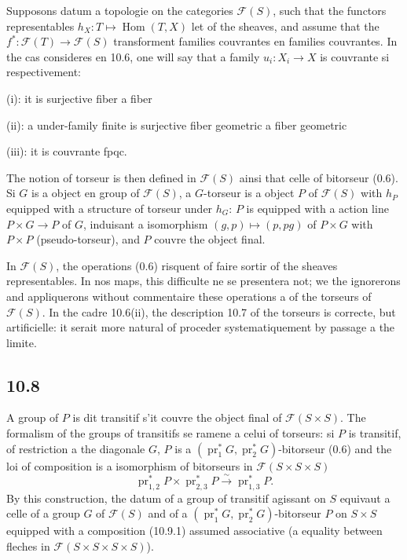 \documentclass[12pt,a4paper]{article}
\theoremstyle{plain}
\theoremstyle{definition}
\theoremstyle{remark}
\DeclareMathOperator{\Hom}{Hom}
\DeclareMathOperator{\pr}{pr}
\begin{document}
Supposons datum a topologie on the categories $\mathcal{F}(S)$, such that the functors representables $h_X: T \mapsto \Hom(T, X)$ let of the sheaves, and assume that the $f^*: \mathcal{F}(T) \to \mathcal{F}(S)$ transforment families couvrantes en families couvrantes. In the cas consideres en 10.6, one will say that a family $u_i: X_i \to X$ is couvrante si respectivement:

(i): it is surjective fiber a fiber

(ii): a under-family finite is surjective fiber geometric a fiber geometric

(iii): it is couvrante fpqc.

The notion of torseur is then defined in $\mathcal{F}(S)$ ainsi that celle of bitorseur (0.6). Si $G$ is a object en group of $\mathcal{F}(S)$, a $G$-torseur is a object $P$ of $\mathcal{F}(S)$ with $h_P$ equipped with a structure of torseur under $h_G$: $P$ is equipped with a action line $P \times G \to P$ of $G$, induisant a isomorphism $(g,p) \mapsto (p, pg)$ of $P \times G$ with $P \times P$ (pseudo-torseur), and $P$ couvre the object final.

In $\mathcal{F}(S)$, the operations (0.6) risquent of faire sortir of the sheaves representables. In nos maps, this difficulte ne se presentera not; we the ignorerons and appliquerons without commentaire these operations a of the torseurs of $\mathcal{F}(S)$. In the cadre 10.6(ii), the description 10.7 of the torseurs is correcte, but artificielle: it serait more natural of proceder systematiquement by passage a the limite.

\subsection*{10.8}

A group of $P$ is dit transitif s'it couvre the object final of $\mathcal{F}(S \times S)$. The formalism of the groups of transitifs se ramene a celui of torseurs: si $P$ is transitif, of restriction a the diagonale $G$, $P$ is a $(\pr_1^* G, \pr_2^* G)$-bitorseur (0.6) and the loi of composition is a isomorphism of bitorseurs in $\mathcal{F}(S \times S \times S)$
\begin{equation}\label{10.8.1}
\pr_{1,2}^* P \times \pr_{2,3}^* P \xrightarrow{\sim} \pr_{1,3}^* P. \tag{10.8.1}
\end{equation}
By this construction, the datum of a group of transitif agissant on $S$ equivaut a celle of a group $G$ of $\mathcal{F}(S)$ and of a $(\pr_1^* G, \pr_2^* G)$-bitorseur $P$ on $S \times S$ equipped with a composition (10.9.1) assumed associative (a equality between fleches in $\mathcal{F}(S \times S \times S \times S)$).
\end{document}
